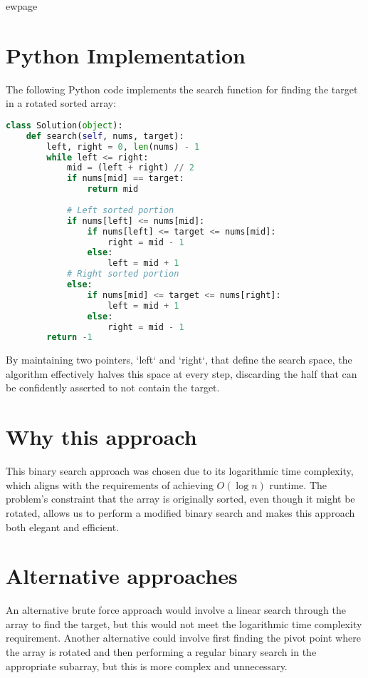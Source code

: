ewpage %
\section*{Python Implementation}

The following Python code implements the search function for finding the target in a rotated sorted array:

\begin{fullwidth}
\begin{lstlisting}[language=Python]
class Solution(object):
    def search(self, nums, target):
        left, right = 0, len(nums) - 1
        while left <= right:
            mid = (left + right) // 2
            if nums[mid] == target:
                return mid
            
            # Left sorted portion
            if nums[left] <= nums[mid]:
                if nums[left] <= target <= nums[mid]:
                    right = mid - 1
                else:
                    left = mid + 1
            # Right sorted portion
            else:
                if nums[mid] <= target <= nums[right]:
                    left = mid + 1
                else:
                    right = mid - 1
        return -1
\end{lstlisting}

\end{fullwidth}

By maintaining two pointers, `left` and `right`, that define the search space, the algorithm effectively halves this space at every step, discarding the half that can be confidently asserted to not contain the target.

\section*{Why this approach}
This binary search approach was chosen due to its logarithmic time complexity, which aligns with the requirements of achieving \( O(\log n) \) runtime. The problem's constraint that the array is originally sorted, even though it might be rotated, allows us to perform a modified binary search and makes this approach both elegant and efficient.

\section*{Alternative approaches}
An alternative brute force approach would involve a linear search through the array to find the target, but this would not meet the logarithmic time complexity requirement. Another alternative could involve first finding the pivot point where the array is rotated and then performing a regular binary search in the appropriate subarray, but this is more complex and unnecessary.

